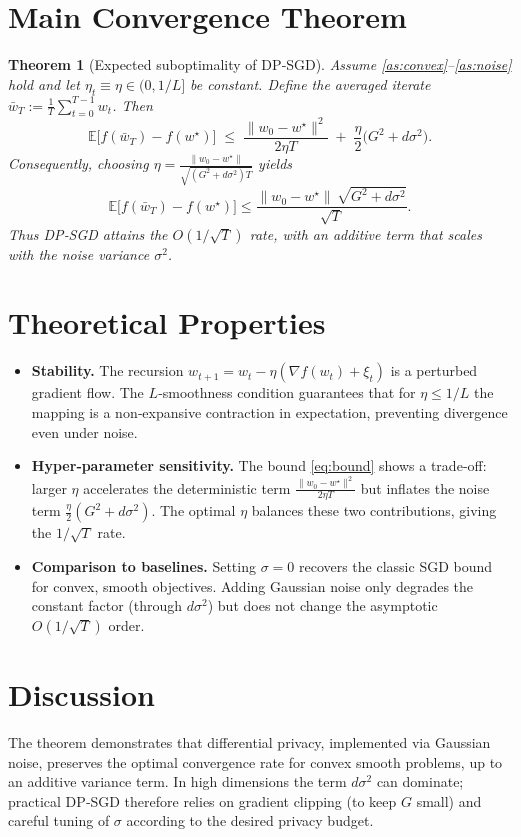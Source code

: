 \documentclass{article}
\newtheorem{theorem}{Theorem}
\newcommand{\E}{\mathbb{E}}
\begin{document}
\section*{Main Convergence Theorem}
\begin{theorem}[Expected suboptimality of DP‑SGD]\label{thm:main}
Assume \ref{as:convex}–\ref{as:noise} hold and let $\eta_t\equiv\eta\in(0,1/L]$ be constant.  Define the averaged iterate $\bar w_T:=\frac1T\sum_{t=0}^{T-1}w_t$.  Then
\begin{equation}\label{eq:bound}
\E\!\big[ f(\bar w_T)-f(w^\star)\big]\;\le\;
\frac{\|w_0-w^\star\|^2}{2\eta T}
\;+\;
\frac{\eta}{2}\big(G^2+d\sigma^2\big).
\end{equation}
Consequently, choosing $\eta=\frac{\|w_0-w^\star\|}{\sqrt{(G^2+d\sigma^2)T}}$ yields
\[
\E\!\big[ f(\bar w_T)-f(w^\star)\big]\le
\frac{\|w_0-w^\star\|\,\sqrt{G^2+d\sigma^2}}{\sqrt{T}}.
\]
Thus DP‑SGD attains the $O(1/\sqrt{T})$ rate, with an additive term that scales with the noise variance $\sigma^2$.
\end{theorem}

\section*{Theoretical Properties}
\begin{itemize}
\item \textbf{Stability.}  The recursion $w_{t+1}=w_t-\eta(\nabla f(w_t)+\xi_t)$ is a perturbed gradient flow.  The $L$‑smoothness condition guarantees that for $\eta\le1/L$ the mapping is a non‑expansive contraction in expectation, preventing divergence even under noise.
\item \textbf{Hyper‑parameter sensitivity.}  The bound \eqref{eq:bound} shows a trade‑off: larger $\eta$ accelerates the deterministic term $\frac{\|w_0-w^\star\|^2}{2\eta T}$ but inflates the noise term $\frac{\eta}{2}(G^2+d\sigma^2)$.  The optimal $\eta$ balances these two contributions, giving the $1/\sqrt{T}$ rate.
\item \textbf{Comparison to baselines.}  Setting $\sigma=0$ recovers the classic SGD bound for convex, smooth objectives.  Adding Gaussian noise only degrades the constant factor (through $d\sigma^2$) but does not change the asymptotic $O(1/\sqrt{T})$ order.
\end{itemize}

\section*{Discussion}
The theorem demonstrates that differential privacy, implemented via Gaussian noise, preserves the optimal convergence rate for convex smooth problems, up to an additive variance term.  In high dimensions the term $d\sigma^2$ can dominate; practical DP‑SGD therefore relies on gradient clipping (to keep $G$ small) and careful tuning of $\sigma$ according to the desired privacy budget.
\end{document}
